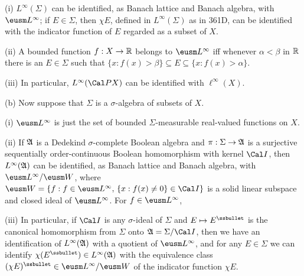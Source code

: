 \quad(i) $L^{\infty}(\Sigma)$ can be identified, as Banach lattice and 
Banach algebra, with $\eusm L^{\infty}$;  if $E\in\Sigma$, then
$\chi E$, defined in $L^{\infty}(\Sigma)$ as in 361D, can be identified
with the indicator function of $E$ regarded as a subset of $X$.

\quad(ii) A bounded function $f:X\to\Bbb R$ belongs to $\eusm L^{\infty}$
iff whenever $\alpha<\beta$ in $\Bbb R$ there is an $E\in\Sigma$ such that
$\{x:f(x)>\beta\}\subseteq E\subseteq\{x:f(x)>\alpha\}$.

\quad(iii) In particular, $L^{\infty}(\Cal PX)$
can be identified with $\ell^{\infty}(X)$.

(b) Now suppose that $\Sigma$ is a $\sigma$-algebra of subsets of $X$.

\quad(i) $\eusm L^{\infty}$ is just the set of bounded $\Sigma$-measurable
real-valued functions on $X$.   

\quad(ii) If $\frak A$ is a Dedekind $\sigma$-complete Boolean algebra and
$\pi:\Sigma\to\frak A$ is a surjective sequentially order-continuous
Boolean homomorphism with kernel $\Cal I$, then $L^{\infty}(\frak A)$
can be identified, as Banach lattice and Banach algebra, with
$\eusm L^{\infty}/\eusm W$, where
$\eusm W=\{f:f\in\eusm L^{\infty},\,\{x:f(x)\ne 0\}\in\Cal I\}$
is a solid linear subspace and closed ideal
of $\eusm L^{\infty}$.   For $f\in\eusm L^{\infty}$,


\quad(iii) In particular, if $\Cal I$ is any $\sigma$-ideal of $\Sigma$ and
$E\mapsto E^{\ssbullet}$ is the canonical homomorphism from $\Sigma$
onto $\frak A=\Sigma/\Cal I$, then we have an identification of
$L^{\infty}(\frak A)$ with a quotient of $\eusm L^{\infty}$, and for any
$E\in\Sigma$ we can identify $\chi(E^{\ssbullet})\in L^{\infty}(\frak
A)$ with the equivalence class $(\chi E)^{\ssbullet}\in\eusm
L^{\infty}/\eusm W$ of the indicator function $\chi E$.


